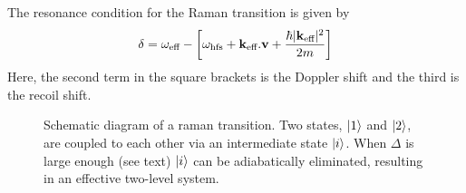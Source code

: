 The resonance condition for the Raman transition is given by 
\begin{equation}
  \delta = \omega_\textnormal{eff} - \left[\omega_\textnormal{hfs} + {\textbf k_\textnormal{eff}} .
\textbf{v} + \frac{\hbar |{\textbf k_\textnormal{eff}}|^2}{2m}\right]
  \label{eq:raman_detuning}
\end{equation}
Here, the second term in the square brackets is the Doppler shift and
the third is the recoil shift.
\begin{figure}[htpb]
  \centering
  \fontsize{16pt}{16pt}
  \resizebox{0.4\textwidth}{!}{}
  \caption[Schematic diagram of a raman transition.]{Schematic diagram of a raman transition. Two states,
  $\ket{1}$ and $\ket{2}$, are coupled to each other via
  an
  intermediate state $\ket{i}$. When $\Delta$ is large enough (see
  text) $\ket{i}$ can be adiabatically eliminated, resulting in an
effective two-level system.}
  \label{fig:raman_model}
\end{figure}
